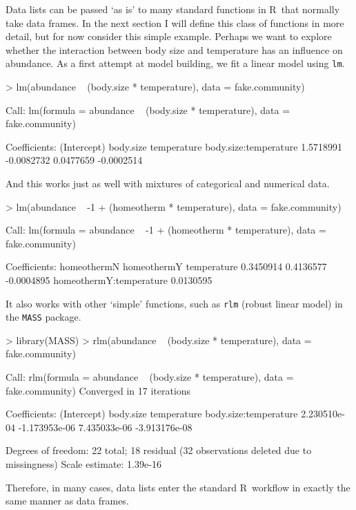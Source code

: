 \documentclass{article}
\newcommand{\R}{{\sf R}}
\newcommand{\code}[1]{\texttt{#1}}
\numberwithin{exercise}{section}
\begin{document}
Data lists can be passed `as is' to many standard functions in \R\ that normally take data frames.  In the next section I will define this class of functions in more detail, but for now consider this simple example.  Perhaps we want to explore whether the interaction between body size and temperature has an influence on abundance.  As a first attempt at model building, we fit a linear model using \code{lm}.
\begin{Schunk}
\begin{Sinput}
> lm(abundance ~ (body.size * temperature), data = fake.community)
\end{Sinput}
\begin{Soutput}
Call:
lm(formula = abundance ~ (body.size * temperature), data = fake.community)

Coefficients:
          (Intercept)              body.size            temperature  body.size:temperature  
            1.5718991             -0.0082732              0.0477659             -0.0002514  
\end{Soutput}
\end{Schunk}
And this works just as well with mixtures of categorical and numerical data.
\begin{Schunk}
\begin{Sinput}
> lm(abundance ~ -1 + (homeotherm * temperature), data = fake.community)
\end{Sinput}
\begin{Soutput}
Call:
lm(formula = abundance ~ -1 + (homeotherm * temperature), data = fake.community)

Coefficients:
            homeothermN              homeothermY              temperature  
              0.3450914                0.4136577               -0.0004895  
homeothermY:temperature  
              0.0130595  
\end{Soutput}
\end{Schunk}
It also works with other `simple' functions, such as \code{rlm} (robust linear model) in the \code{MASS} package.
\begin{Schunk}
\begin{Sinput}
> library(MASS)
> rlm(abundance ~ (body.size * temperature), data = fake.community)
\end{Sinput}
\begin{Soutput}
Call:
rlm(formula = abundance ~ (body.size * temperature), data = fake.community)
Converged in 17 iterations

Coefficients:
          (Intercept)             body.size           temperature body.size:temperature 
         2.230510e-04         -1.173953e-06          7.435033e-06         -3.913176e-08 

Degrees of freedom: 22 total; 18 residual
  (32 observations deleted due to missingness)
Scale estimate: 1.39e-16 
\end{Soutput}
\end{Schunk}
\noindent Therefore, in many cases, data lists enter the standard \R\ workflow in exactly the same manner as data frames.
\end{document}
